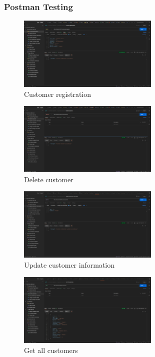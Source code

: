 \documentclass[a4paper,12pt]{article}
\begin{document}
\subsubsection{Postman Testing}
\begin{figure}[H]
  \centering
  \includegraphics[width=0.6\textwidth]{images/1.png}
  \caption{Customer registration}
\end{figure}
\begin{figure}[H]
  \centering
  \includegraphics[width=0.6\textwidth]{images/2.png}
  \caption{Delete customer}
\end{figure}
\begin{figure}[H]
  \centering
  \includegraphics[width=0.6\textwidth]{images/3.png}
  \caption{Update customer information}
\end{figure}
\begin{figure}[H]
  \centering
  \includegraphics[width=0.6\textwidth]{images/4.png}
  \caption{Get all customers}
\end{figure}
\end{document}
